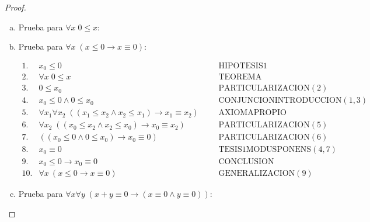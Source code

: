  \begin{proof}
    \begin{enumerate}[(a)]
      \item Prueba para $\forall x \; 0 \leq x$:

      \item Prueba para $\forall x \; (x \leq 0 \rightarrow x \equiv 0)$:

        $\begin{array}{lllll}
          1. & x_{0} \leq 0 &&& \text{HIPOTESIS}1 \\
          2. & \forall x \; 0 \leq x &&& \text{TEOREMA} \\
          3. & 0 \leq x_{0} &&& \text{PARTICULARIZACION}(2) \\
          4. & x_{0} \leq 0 \wedge 0 \leq x_{0} &&& \text{CONJUNCIONINTRODUCCION}(1,3) \\
          5. & \forall x_{1} \forall x_{2} \; ((x_{1} \leq x_{2} \wedge x_{2} \leq x_{1}) \rightarrow x_{1} \equiv
            x_{2}) &&& \text{AXIOMAPROPIO} \\
          6. & \forall x_{2} \; ((x_{0} \leq x_{2} \wedge x_{2} \leq x_{0}) \rightarrow x_{0} \equiv x_{2}) &&&
            \text{PARTICULARIZACION}(5) \\
          7. & ((x_{0}\leq 0\wedge 0\leq x_{0})\rightarrow x_{0}\equiv 0) &&& \text{PARTICULARIZACION}(6) \\
          8. & x_{0}\equiv 0 &&& \text{TESIS}1\text{MODUSPONENS}(4,7) \\
          9. & x_{0}\leq 0\rightarrow x_{0}\equiv 0 &&& \text{CONCLUSION} \\
          10. & \forall x\ (x\leq 0\rightarrow x\equiv 0) &&& \text{GENERALIZACION} (9)
        \end{array}$

        \item Prueba para $\forall x \forall y \; (x + y \equiv 0 \rightarrow (x \equiv 0 \wedge y \equiv 0))$:


\end{enumerate}
\end{proof}
